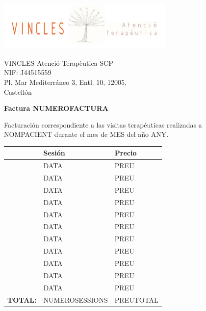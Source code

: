 \documentclass[11pt,a4paper]{article}
\begin{document}
\pagestyle{empty}

\mbox{}

\vspace{-2cm}
\begin{center}
	\includegraphics[width=0.65\textwidth]{logo.png}
\end{center}


{\footnotesize

	\noindent
	\begin{minipage}{0.4\textwidth}
		VINCLES Atenció Terapèutica SCP\\
		NIF: J44515559\\
		Pl. Mar Mediterráneo 3, Entl. 10, 12005,\\
		Castellón 
	\end{minipage}
	\hfill

}

\vspace{1cm}

\noindent
\textbf{Factura {NUMEROFACTURA}}

Facturación correspondiente a las visitas terapéuticas realizadas a
{NOMPACIENT} %
durante el mes de {MES} del año {ANY}.


\begin{center}
	\begin{tabular}{rp{}<{\centering}p{}<{\centering}}
		\toprule
		&\textbf{Sesión}	&\textbf{Precio} \\
		\midrule
		&{DATA}	&{PREU} \EURtm \\	
		&{DATA}	&{PREU} \EURtm \\	
		&{DATA}	&{PREU} \EURtm \\	
		&{DATA}	&{PREU} \EURtm \\	
		&{DATA}	&{PREU} \EURtm \\	
		&{DATA}	&{PREU} \EURtm \\	
		&{DATA}	&{PREU} \EURtm \\	
		&{DATA}	&{PREU} \EURtm \\	
		&{DATA}	&{PREU} \EURtm \\	
		&{DATA}	&{PREU} \EURtm \\	
		&{DATA}	&{PREU} \EURtm \\	
		\midrule
		\textbf{TOTAL:}
		&{NUMEROSESSIONS}	&{PREUTOTAL} \EURtm \\
		\bottomrule
	\end{tabular}
\end{center}
\end{document}
